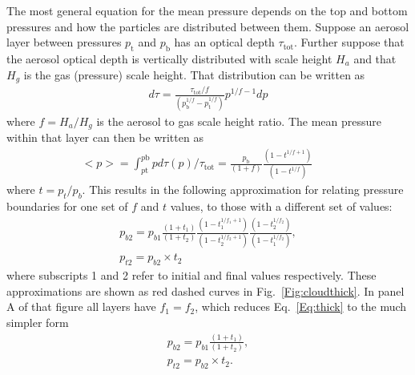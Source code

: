 \documentclass[article,11pt]{emulateapj}
\begin{document}
The most general equation for the mean pressure depends on the top and bottom
pressures and how the particles are distributed between them.
 Suppose an aerosol layer between pressures $p_\mathrm{t}$ and $p_\mathrm{b}$ has an
optical depth $\tau_\mathrm{tot}$. Further suppose that the aerosol optical depth is vertically
distributed with scale height $H_a$ and that $H_g$ is the gas (pressure) scale height.
That distribution can be written as \begin{eqnarray}
d\tau = \frac{\tau_\mathrm{tot}/f}{(p_\mathrm{b}^{1/f} - p_\mathrm{t}^{1/f})}p^{1/f -1} dp
\end{eqnarray}
where $f=H_a/H_g$ is the aerosol to gas scale height ratio.  The mean pressure within that layer can then be written as
\begin{eqnarray}
<p> = \int_{p\mathrm{t}}^{p\mathrm{b}}{p d\tau(p)}/\tau_\mathrm{tot} = \frac{p_\mathrm{b}}{(1+f)}
     \frac{(1-t^{1/f +1})}{(1-t^{1/f})} \qquad
\end{eqnarray}
where $t = p_t/p_b$.  This results in the following approximation for relating pressure boundaries for one set of $f$ and $t$ values, to those with a different set of values:
\begin{eqnarray}
p_{b2} = p_{b1} \frac{(1+t_1)}{(1+t_2)}\frac{(1-t_1^{1/f_1+1})}{(1-t_2^{1/f_2+1})}
     \frac{(1-t_2^{1/f_2})}{(1-t_1^{1/f_2})}, \\ \nonumber
p_{t2} = p_{b2}\times t_2 \label{Eq:thick}
\end{eqnarray}
where subscripts 1 and 2 refer to initial and final values respectively.  These approximations
are shown as red dashed curves in Fig.\ \ref{Fig:cloudthick}.  In panel A of that figure
all layers have $f_1=f_2$, which reduces Eq.\ \ref{Eq:thick} to the much simpler form
\begin{eqnarray}
p_{b2} = p_{b1}  \frac{(1+t_1)}{(1+t_2)},\\ \nonumber 
p_{t2} = p_{b2}\times t_2.
\end{eqnarray}
\end{document}
